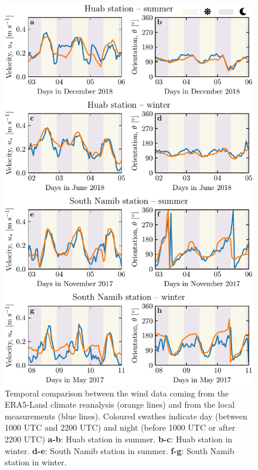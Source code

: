 \begin{figure}
\centering
\includegraphics[scale=1]{Figures/Figure5_supp.pdf}
\caption{Temporal comparison between the wind data coming from the ERA5-Land climate reanalysis (orange lines) and from the local measurements (blue lines). Coloured swathes indicate day (between 1000 UTC and 2200 UTC) and night (before 1000 UTC or after 2200 UTC) \textbf{a-b}: Huab station in summer. \textbf{b-c}: Huab station in winter. \textbf{d-e}: South Namib station in summer. \textbf{f-g}: South Namib station in winter.}
\label{Fig5_supp}
\end{figure}

